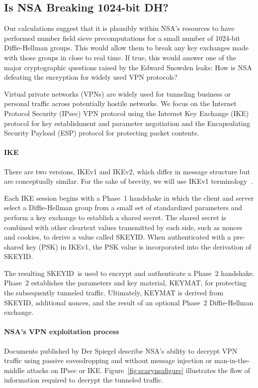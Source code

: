 \subsection{Is NSA Breaking 1024-bit DH?}

Our calculations suggest that it is plausibly within NSA's resources to have
performed number field sieve precomputations for a small number of 1024-bit
Diffie-Hellman groups. This would allow them to break any key exchanges made
with those groups in close to real time. If true, this would answer one of
the major cryptographic questions raised by the Edward Snowden leaks: How is
NSA defeating the encryption for widely used VPN protocols?

Virtual private networks (VPNs) are widely used for tunneling business or
personal traffic across potentially hostile networks. We focus on the
Internet Protocol Security (IPsec) VPN protocol using the Internet Key
Exchange (IKE) protocol for key establishment and parameter negotiation and
the Encapsulating Security Payload (ESP) protocol for protecting packet
contents.

\paragraph{IKE}
There are two versions, IKEv1 and IKEv2, which differ in message structure
but are conceptually similar. For the sake of brevity, we will use IKEv1
terminology~\cite{rfc7296}.

\newcommand{\skeyid}{\textsf{\small SKEYID}}
\newcommand{\keymat}{\textsf{\small KEYMAT}}
\newcommand{\psk}{\textsf{\small PSK}}

Each IKE session begins with a Phase~1 handshake in which the client and
server select a Diffie-Hellman group from a small set of standardized
parameters and perform a key exchange to establish a shared secret. The
shared secret is combined with other cleartext values transmitted by each
side, such as nonces and cookies, to derive a value called \skeyid\@. When
authenticated with a pre-shared key (PSK) in IKEv1, the PSK value is
incorporated into the derivation of \skeyid.

The resulting \skeyid\ is used to encrypt and authenticate a Phase~2
handshake. Phase~2 establishes the parameters and key material, \keymat, for
protecting the subsequently tunneled traffic. Ultimately, \keymat{} is
derived from \skeyid, additional nonces, and the result of an optional
Phase~2 Diffie-Hellman exchange.

\paragraph{NSA's VPN exploitation process}
Documents published by Der Spiegel describe NSA's ability to decrypt VPN
traffic using passive eavesdropping and without message injection or
man-in-the-middle attacks on IPsec or IKE\@. Figure~\ref{fig:scarynsafigure}
illustrates the flow of information required to decrypt the tunneled traffic.

